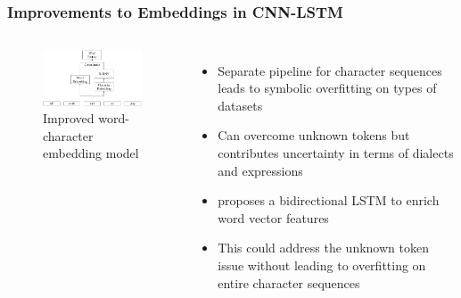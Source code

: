 \documentclass{beamer}
\begin{document}
\subsection{}
\begin{framefont}{\footnotesize}
	\begin{frame}
		\frametitle{Improvements to Embeddings in CNN-LSTM}
		\vspace{-10pt}
		\begin{columns}
			\centering
			\begin{figure}
				\captionsetup{justification=centering}
				\includegraphics[width=4.5cm]{improved_rnn.png}
				\caption{Improved word-character embedding model \parencite{improvedRNN}}
			\end{figure}
			\begin{itemize}
				\setlength\itemsep{1.5em}
				\item Separate pipeline for character sequences leads to symbolic overfitting on types of datasets
				\item Can overcome unknown tokens but contributes uncertainty in terms of dialects and expressions
				\item \textcite{improvedRNN} proposes a bidirectional LSTM to enrich word vector features
				\item This could address the unknown token issue without leading to overfitting on entire character sequences
			\end{itemize}
		\end{columns}
	\end{frame}
\end{framefont}


\end{document}
